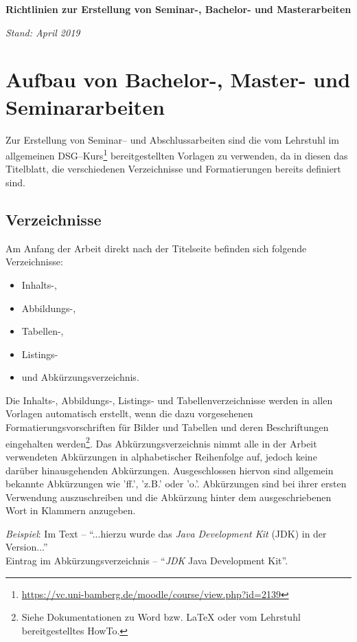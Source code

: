 
%

\atitle
%
\begin{center}
{\bf\huge Richtlinien zur Erstellung von Seminar-, Bachelor- und Masterarbeiten}

{\it Stand: April 2019}
\end{center}
%
\section{Aufbau von Bachelor-, Master- und Seminararbeiten}
%
Zur Erstellung von Seminar-- und Abschlussarbeiten sind die vom Lehrstuhl im allgemeinen DSG--Kurs\footnote{\url{https://vc.uni-bamberg.de/moodle/course/view.php?id=2139}} bereitgestellten Vorlagen zu verwenden, da in diesen das Titelblatt, die verschiedenen Verzeichnisse und Formatierungen bereits definiert sind.

\subsection{Verzeichnisse}

Am Anfang der Arbeit direkt nach der Titelseite befinden sich folgende Verzeichnisse:

\begin{itemize}
	\item Inhalts-,
	\item Abbildungs-,
	\item Tabellen-,
	\item Listings-
	\item und Abkürzungsverzeichnis.
\end{itemize}
	
Die Inhalts-, Abbildungs-, Listings- und Tabellenverzeichnisse werden in allen Vorlagen automatisch
erstellt, wenn die dazu vorgesehenen Formatierungsvorschriften für Bilder und Tabellen
und deren Beschriftungen eingehalten werden\footnote{Siehe Dokumentationen zu Word bzw. LaTeX oder vom Lehrstuhl bereitgestelltes HowTo.}. 
Das Abkürzungsverzeichnis nimmt alle
in der Arbeit verwendeten Abkürzungen in alphabetischer Reihenfolge auf, jedoch keine
darüber hinausgehenden Abkürzungen. Ausgeschlossen hiervon sind allgemein bekannte
Abkürzungen wie 'ff.', 'z.B.' oder 'o.'. Abkürzungen sind bei ihrer ersten Verwendung
auszuschreiben und die Abkürzung hinter dem ausgeschriebenen Wort in Klammern anzugeben.

\textit{Beispiel}: Im Text -- "`...hierzu wurde das \textit{Java Development Kit} (JDK) in der Version..."'\\
Eintrag im Abkürzungsverzeichnis -- "`\textit{JDK} \hspace{10pt} Java Development Kit"'.


